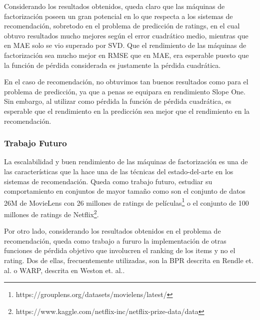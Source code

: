 \documentclass[hidelinks,12pt,a4paper]{book}
\theoremstyle{plain}
\theoremstyle{definition}
\begin{document}
Considerando los resultados obtenidos, queda claro que las máquinas de factorización poseen un gran potencial en lo que respecta a los sistemas de recomendación, sobretodo en el problema de predicción de ratings, en el cual obtuvo resultados mucho mejores según el error cuadrático medio, mientras que en MAE solo se vio superado por SVD. Que el rendimiento de las máquinas de factorización sea mucho mejor en RMSE que en MAE, era esperable puesto que la función de pérdida considerada es justamente la pérdida cuadrática.

En el caso de recomendación, no obtuvimos tan buenos resultados como para el problema de predicción, ya que a penas se equipara en rendimiento Slope One. Sin embargo, al utilizar como pérdida la función de pérdida cuadrática, es esperable que el rendimiento en la predicción sea mejor que el rendimiento en la recomendación.

\subsubsection{Trabajo Futuro}

La escalabilidad y buen rendimiento de las máquinas de factorización es una de las características que la hace una de las técnicas del estado-del-arte en los sistemas de recomendación. Queda como trabajo futuro, estudiar su comportamiento en conjuntos de mayor tamaño como son el conjunto de datos 26M de MovieLens con 26 millones de ratings de películas\footnote{https://grouplens.org/datasets/movielens/latest/} o el conjunto de 100 millones de ratings de Netflix\footnote{https://www.kaggle.com/netflix-inc/netflix-prize-data/data}.

Por otro lado, considerando los resultados obtenidos en el problema de recomendación, queda como trabajo a fururo la implementación de otras funciones de pérdida objetivo que involucren el ranking de los items y no el rating. Dos de ellas, frecuentemente utilizadas, son la BPR descrita en Rendle et. al.\cite{rendle2009bpr} o WARP, descrita en Weston et. al.\cite{weston2011warp}.

\end{document}
